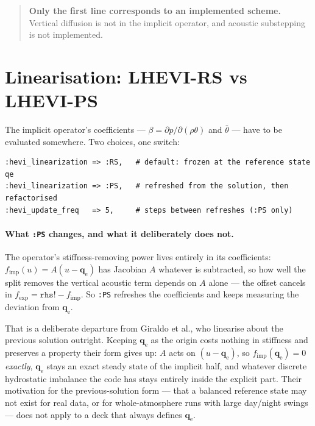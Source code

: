 \documentclass[11pt,a4paper]{article}
\newcommand{\qe}{\bm{q}_{\mathrm{e}}}
\newcommand{\fexp}{f_{\mathrm{exp}}}
\newcommand{\fimp}{f_{\mathrm{imp}}}
\begin{document}
\begin{quote}
\textbf{Only the first line corresponds to an implemented scheme.} Vertical
diffusion is not in the implicit operator, and acoustic substepping is not
implemented.
\end{quote}

\section{Linearisation: LHEVI-RS vs LHEVI-PS}\label{sec:linmode}
The implicit operator's coefficients --- $\beta = \partial p/\partial(\rho\theta)$
and $\bar\theta$ --- have to be evaluated somewhere. Two choices, one switch:
\begin{lstlisting}
:hevi_linearization => :RS,   # default: frozen at the reference state qe
:hevi_linearization => :PS,   # refreshed from the solution, then refactorised
:hevi_update_freq   => 5,     # steps between refreshes (:PS only)
\end{lstlisting}

\paragraph{What \texttt{:PS} changes, and what it deliberately does not.}
The operator's stiffness-removing power lives entirely in its coefficients:
$f_{\mathrm{imp}}(u) = A(u-\qe)$ has Jacobian $A$ whatever is subtracted, so how
well the split removes the vertical acoustic term depends on $A$ alone --- the
offset cancels in $\fexp = \texttt{rhs!} - \fimp$. So \texttt{:PS} refreshes the
coefficients and keeps measuring the deviation from $\qe$.

That is a deliberate departure from Giraldo et al., who linearise about the
previous solution outright. Keeping $\qe$ as the origin costs nothing in
stiffness and preserves a property their form gives up: $A$ acts on $(u-\qe)$,
so $\fimp(\qe)=0$ \emph{exactly}, $\qe$ stays an exact steady state of the
implicit half, and whatever discrete hydrostatic imbalance the code has stays
entirely inside the explicit part. Their motivation for the previous-solution
form --- that a balanced reference state may not exist for real data, or for
whole-atmosphere runs with large day/night swings --- does not apply to a deck
that always defines $\qe$.
\end{document}
